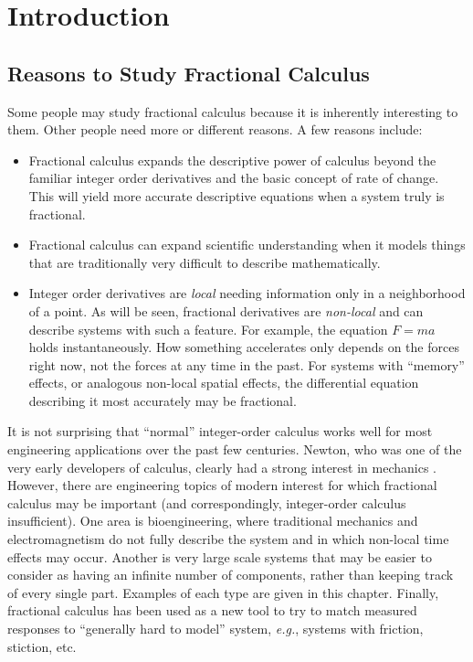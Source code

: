 \chapter{Introduction}

\section{Reasons to Study Fractional Calculus}
Some people may study fractional calculus because it is inherently interesting to them. Other people need more or different reasons. A few reasons include:
\begin{itemize}
  \item Fractional calculus expands the descriptive power of calculus beyond the familiar integer order derivatives and the basic concept of rate of change. This will yield more accurate descriptive equations when a system truly is fractional.
  \item Fractional calculus can expand scientific understanding when it models things that are traditionally very difficult to describe mathematically.
  \item Integer order derivatives are \emph{local} needing information only in a neighborhood of a point. As will be seen, fractional derivatives are \emph{non-local} and can describe systems with such a feature. For example, the equation $F=ma$ holds instantaneously. How something accelerates only depends on the forces right now, not the forces at any time in the past. For systems with ``memory'' effects, or analogous non-local spatial effects, the differential equation describing it most accurately may be fractional.
\end{itemize}

It is not surprising that ``normal'' integer-order calculus works well for most engineering applications over the past few centuries. Newton, who was one of the very early developers of calculus, clearly had a strong interest in mechanics \cite{principia}. However, there are engineering topics of modern interest for which fractional calculus may be important (and correspondingly, integer-order calculus insufficient). One area is bioengineering, where traditional mechanics and electromagnetism do not fully describe the system and in which non-local time effects may occur. Another is very large scale systems that may be easier to consider as having an infinite number of components, rather than keeping track of every single part. Examples of each type are given in this chapter.  Finally, fractional calculus has been used as a new tool to try to match measured responses to ``generally hard to model'' system, \textit{e.g.}, systems with friction, stiction, etc. 

